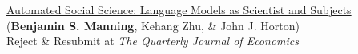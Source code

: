 \documentclass[margin,line,pifont,palatino,courier, 9pt]{res}
\begin{document}
\begin{resume}

\href{https://www.nber.org/papers/w32381}{Automated Social Science: Language Models as Scientist and Subjects}\\
(\textbf{Benjamin S. Manning}\footnotemark[\value{footnote}], Kehang Zhu\footnotemark[\value{footnote}], \& John J. Horton)\\
Reject \& Resubmit at \textit{The Quarterly Journal of Economics}


\end{resume}
\end{document}
